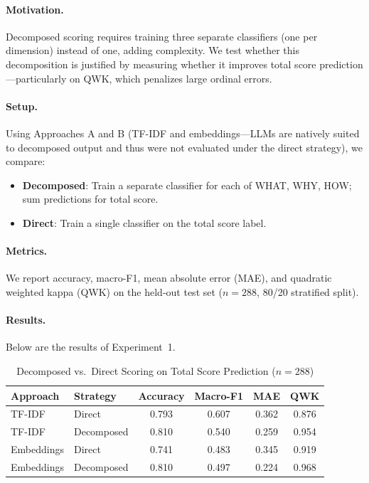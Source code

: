 \documentclass[11pt]{article}
\begin{document}
\paragraph{Motivation.} Decomposed scoring requires training three separate classifiers (one per dimension) instead of one, adding complexity. We test whether this decomposition is justified by measuring whether it improves total score prediction—particularly on QWK, which penalizes large ordinal errors.

\paragraph{Setup.} Using Approaches A and B (TF-IDF and embeddings—LLMs are natively suited to decomposed output and thus were not evaluated under the direct strategy), we compare:
\begin{itemize}
    \item \textbf{Decomposed}: Train a separate classifier for each of WHAT, WHY, HOW; sum predictions for total score.
    \item \textbf{Direct}: Train a single classifier on the total score label.
\end{itemize}
\paragraph{Metrics.} We report accuracy, macro-F1, mean absolute error (MAE), and quadratic weighted kappa (QWK) on the held-out test set ($n = 288$, 80/20 stratified split).

\paragraph{Results.} Below are the results of Experiment~1.

\begin{table}[H]
\centering
\caption{Decomposed vs.\ Direct Scoring on Total Score Prediction ($n=288$)}
\label{tab:exp1}
\begin{tabular}{llcccc}
\toprule
\textbf{Approach} & \textbf{Strategy} & \textbf{Accuracy} & \textbf{Macro-F1} & \textbf{MAE} & \textbf{QWK} \\
\midrule
TF-IDF     & Direct     & 0.793 & 0.607 & 0.362 & 0.876 \\
TF-IDF     & Decomposed & 0.810 & 0.540 & 0.259 & 0.954 \\
Embeddings & Direct     & 0.741 & 0.483 & 0.345 & 0.919 \\
Embeddings & Decomposed & 0.810 & 0.497 & 0.224 & 0.968 \\
\bottomrule
\end{tabular}
\end{table}
\end{document}
